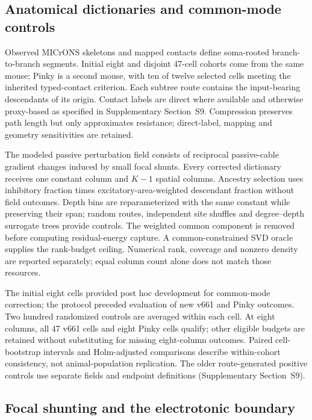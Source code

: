 \documentclass[11pt]{article}
\begin{document}
\subsection*{Anatomical dictionaries and common-mode controls}

Observed MICrONS skeletons and mapped contacts define soma-rooted branch-to-branch segments. Initial eight and disjoint 47-cell cohorts come from the same mouse; Pinky is a second mouse, with ten of twelve selected cells meeting the inherited typed-contact criterion. Each subtree route contains the input-bearing descendants of its origin. Contact labels are direct where available and otherwise proxy-based as specified in Supplementary Section~S9. Compression preserves path length but only approximates resistance; direct-label, mapping and geometry sensitivities are retained.

The modeled passive perturbation field consists of reciprocal passive-cable gradient changes induced by small focal shunts. Every corrected dictionary receives one constant column and $K-1$ spatial columns. Ancestry selection uses inhibitory fraction times excitatory-area-weighted descendant fraction without field outcomes. Depth bins are reparameterized with the same constant while preserving their span; random routes, independent site shuffles and degree--depth surrogate trees provide controls. The weighted common component is removed before computing residual-energy capture. A common-constrained SVD oracle supplies the rank-budget ceiling. Numerical rank, coverage and nonzero density are reported separately; equal column count alone does not match those resources.

The initial eight cells provided post hoc development for common-mode correction; the protocol preceded evaluation of new v661 and Pinky outcomes. Two hundred randomized controls are averaged within each cell. At eight columns, all 47 v661 cells and eight Pinky cells qualify; other eligible budgets are retained without substituting for missing eight-column outcomes. Paired cell-bootstrap intervals and Holm-adjusted comparisons describe within-cohort consistency, not animal-population replication. The older route-generated positive controls use separate fields and endpoint definitions (Supplementary Section~S9).

\subsection*{Focal shunting and the electrotonic boundary}
\end{document}

